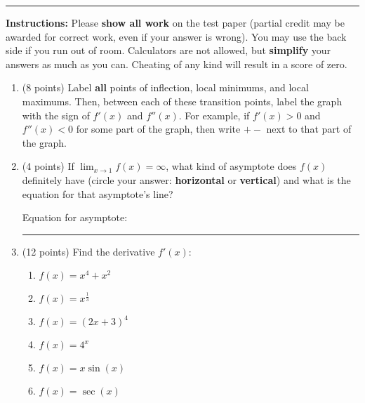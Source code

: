 \documentclass[11pt]{article}
\begin{document}
\Large


\medskip\hrule
\vspace{10pt}

\noindent \textbf{Instructions:} Please \textbf{show all work} on the test paper (partial credit may be awarded for correct work, even if your answer is wrong). You may use the back side if you run out of room. Calculators are not allowed, but \textbf{simplify} your answers as much as you can. Cheating of any kind will result in a score of zero.

\vspace{10pt}

\begin{enumerate}[itemsep=30pt]

\item (8 points) Label \textbf{all} points of inflection, local minimums, and local maximums. Then, between each of these transition points, label the graph with the sign of $f'(x)$ and $f''(x)$. For example, if $f'(x)>0$ and $f''(x)<0$ for some part of the graph, then write $+-$ next to that part of the graph.
\vspace{10pt}
\begin{center}
\end{center}


\item (4 points) If $\lim_{x \to 1} f(x) = \infty$, what kind of asymptote does $f(x)$ definitely have (circle your answer: \textbf{horizontal} or \textbf{vertical}) and what is the equation for that asymptote's line?
\begin{flushright}
Equation for asymptote: \rule{4cm}{0.4pt}
\end{flushright}

\newpage


\item (12 points) Find the derivative $f'(x)$:
\begin{enumerate}[itemsep=40pt]
    \item{$f(x) = x^4 + x^2$}
    \item{$f(x) = x^{\frac{1}{3}}$}
    \item{$f(x) = (2x + 3)^4$}
    \item{$f(x) = 4^x$}
    \item{$f(x) = x \sin(x)$}
    \item{$f(x) = \sec(x)$}
\end{enumerate}


\end{enumerate}
\end{document}
